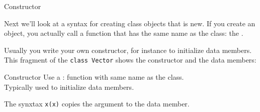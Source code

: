 \begin{comment}
  First of all, you can make an object look pretty much like a
  structure:
  \snippetwithoutput{pointstruct}{geom}{pointstruct}

  Observations about the above code snippet:
  \begin{itemize}
  \item Again we have separate definition of the class and declaration
    of the objects. You define the class only once, after which you can
    make as many objects of that class as you want.
  \item There are data members. We will get to the \indextermtt{public} in a
    minute.
  \item You make an object of that class by using the class name as the
    datatype.
  \item The data members can be accessed with the period.
  \end{itemize}

  \begin{slide}{Classes look a bit like structures}
    \label{sl:class-struct}
    \snippetwithoutput{pointstruct}{geom}{pointstruct}

    Class definition versus object declaration.\\
    We'll get to that `\lstinline{public}' in a minute.
  \end{slide}
\end{comment}

 {Constructor}

Next we'll look at a syntax for creating class objects that is new. If
you create an object, you actually call a function that has the same
name as the class: the .

Usually you write your own constructor,
for instance to initialize data members.
This fragment of the \lstinline{class Vector}
shows the constructor and the data members:
%

\begin{slide}{Constructor}
  \label{sl:class-construct}
  Use a : function with same name as the
  class.\\
  Typically used to initialize data members.
  

  The synxtax \lstinline{x(x)} copies the argument to the data member.
\end{slide}

